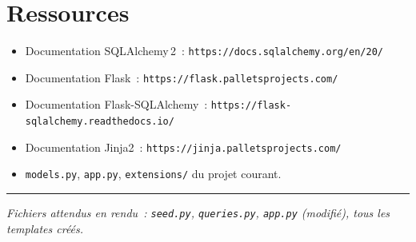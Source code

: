 \documentclass[12pt,a4paper]{article}
\newcommand{\fichier}[1]{\texttt{\textcolor{primary}{#1}}}
\begin{document}
\section{Ressources}

\begin{itemize}
    \item Documentation SQLAlchemy\,2~: \texttt{https://docs.sqlalchemy.org/en/20/}
    \item Documentation Flask~: \texttt{https://flask.palletsprojects.com/}
    \item Documentation Flask-SQLAlchemy~: \texttt{https://flask-sqlalchemy.readthedocs.io/}
    \item Documentation Jinja2~: \texttt{https://jinja.palletsprojects.com/}
    \item \fichier{models.py}, \fichier{app.py}, \fichier{extensions/} du projet courant.
\end{itemize}

\vspace{12pt}
\hrule
\vspace{6pt}
{\small\textit{Fichiers attendus en rendu~: \fichier{seed.py}, \fichier{queries.py}, \fichier{app.py} (modifié), tous les templates créés.}}
\end{document}
